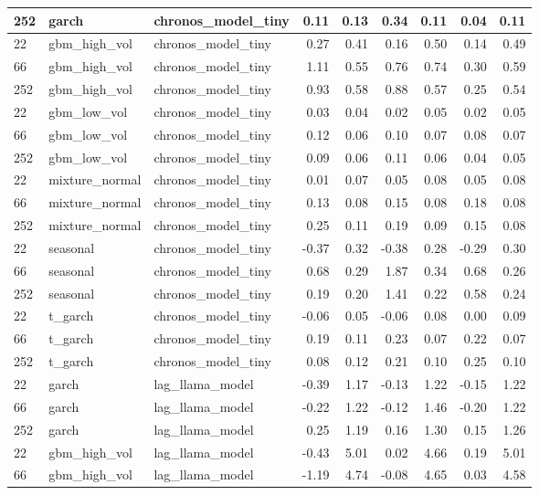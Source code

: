 {\begin{tabular}{lllrrrrrr}
252 & garch & chronos\_model\_tiny & 0.11 & 0.13 & 0.34 & 0.11 & 0.04 & 0.11 \\
\midrule
22 & gbm\_high\_vol & chronos\_model\_tiny & 0.27 & 0.41 & 0.16 & 0.50 & 0.14 & 0.49 \\
66 & gbm\_high\_vol & chronos\_model\_tiny & 1.11 & 0.55 & 0.76 & 0.74 & 0.30 & 0.59 \\
252 & gbm\_high\_vol & chronos\_model\_tiny & 0.93 & 0.58 & 0.88 & 0.57 & 0.25 & 0.54 \\
\midrule
22 & gbm\_low\_vol & chronos\_model\_tiny & 0.03 & 0.04 & 0.02 & 0.05 & 0.02 & 0.05 \\
66 & gbm\_low\_vol & chronos\_model\_tiny & 0.12 & 0.06 & 0.10 & 0.07 & 0.08 & 0.07 \\
252 & gbm\_low\_vol & chronos\_model\_tiny & 0.09 & 0.06 & 0.11 & 0.06 & 0.04 & 0.05 \\
\midrule
22 & mixture\_normal & chronos\_model\_tiny & 0.01 & 0.07 & 0.05 & 0.08 & 0.05 & 0.08 \\
66 & mixture\_normal & chronos\_model\_tiny & 0.13 & 0.08 & 0.15 & 0.08 & 0.18 & 0.08 \\
252 & mixture\_normal & chronos\_model\_tiny & 0.25 & 0.11 & 0.19 & 0.09 & 0.15 & 0.08 \\
\midrule
22 & seasonal & chronos\_model\_tiny & -0.37 & 0.32 & -0.38 & 0.28 & -0.29 & 0.30 \\
66 & seasonal & chronos\_model\_tiny & 0.68 & 0.29 & 1.87 & 0.34 & 0.68 & 0.26 \\
252 & seasonal & chronos\_model\_tiny & 0.19 & 0.20 & 1.41 & 0.22 & 0.58 & 0.24 \\
\midrule
22 & t\_garch & chronos\_model\_tiny & -0.06 & 0.05 & -0.06 & 0.08 & 0.00 & 0.09 \\
66 & t\_garch & chronos\_model\_tiny & 0.19 & 0.11 & 0.23 & 0.07 & 0.22 & 0.07 \\
252 & t\_garch & chronos\_model\_tiny & 0.08 & 0.12 & 0.21 & 0.10 & 0.25 & 0.10 \\
\midrule
22 & garch & lag\_llama\_model & -0.39 & 1.17 & -0.13 & 1.22 & -0.15 & 1.22 \\
66 & garch & lag\_llama\_model & -0.22 & 1.22 & -0.12 & 1.46 & -0.20 & 1.22 \\
252 & garch & lag\_llama\_model & 0.25 & 1.19 & 0.16 & 1.30 & 0.15 & 1.26 \\
\midrule
22 & gbm\_high\_vol & lag\_llama\_model & -0.43 & 5.01 & 0.02 & 4.66 & 0.19 & 5.01 \\
66 & gbm\_high\_vol & lag\_llama\_model & -1.19 & 4.74 & -0.08 & 4.65 & 0.03 & 4.58 \\

\end{tabular}}
